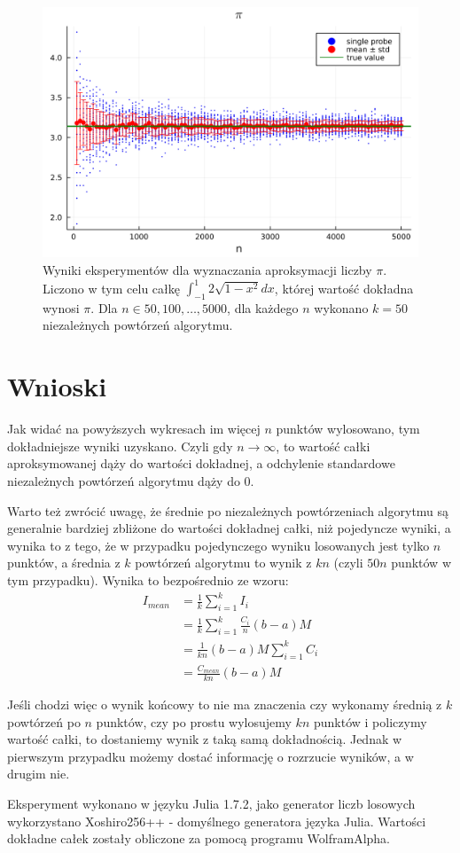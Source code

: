 \documentclass{article}
\begin{document}
\begin{figure}[!htbp]
    \centering
    \includegraphics[width=\linewidth]{results/z1_4.png}
    \caption{Wyniki eksperymentów dla wyznaczania aproksymacji liczby $\pi$. Liczono w tym celu całkę $\int_{-1}^{1} 2\sqrt{1-x^2} dx$, której wartość dokładna wynosi $\pi$. Dla $n \in {50, 100, \dots, 5000}$, dla każdego $n$ wykonano $k=50$ niezależnych powtórzeń algorytmu.}
\end{figure}

\section{Wnioski}
Jak widać na powyższych wykresach im więcej $n$ punktów wylosowano, tym dokładniejsze wyniki uzyskano. Czyli gdy $n\rightarrow \infty$, to wartość całki aproksymowanej dąży do wartości dokładnej, a odchylenie standardowe niezależnych powtórzeń algorytmu dąży do 0.

Warto też zwrócić uwagę, że średnie po niezależnych powtórzeniach algorytmu są generalnie bardziej zbliżone do wartości dokładnej całki, niż pojedyncze wyniki, a wynika to z tego, że w przypadku pojedynczego wyniku losowanych jest tylko $n$ punktów, a średnia z $k$ powtórzeń algorytmu to wynik z $kn$ (czyli $50 n$ punktów w tym przypadku). Wynika to bezpośrednio ze wzoru:
\begin{equation}
    \begin{split}
        I_{mean} &= \frac{1}{k} \sum_{i=1}^k I_i \\
        &= \frac{1}{k}\sum_{i=1}^k \frac{C_i}{n} (b-a) M \\
        &= \frac{1}{kn} (b-a) M \sum_{i=1}^k C_i \\
        &= \frac{C_{mean}}{kn} (b-a) M
    \end{split}
\end{equation}

Jeśli chodzi więc o wynik końcowy to nie ma znaczenia czy wykonamy średnią z $k$ powtórzeń po $n$ punktów, czy po prostu wylosujemy $kn$ punktów i policzymy wartość całki, to dostaniemy wynik z taką samą dokładnością. Jednak w pierwszym przypadku możemy dostać informację o rozrzucie wyników, a w drugim nie.

Eksperyment wykonano w języku Julia 1.7.2, jako generator liczb losowych wykorzystano Xoshiro256++ - domyślnego generatora języka Julia.
Wartości dokładne całek zostały obliczone za pomocą programu WolframAlpha.
\end{document}
